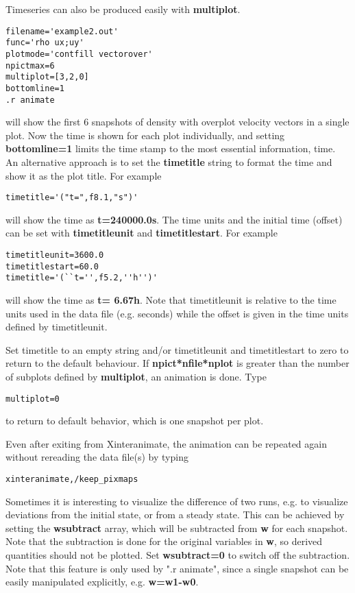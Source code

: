    Timeseries can also be produced easily with {\bf multiplot}. 
\begin{verbatim}
filename='example2.out'
func='rho ux;uy'
plotmode='contfill vectorover'
npictmax=6
multiplot=[3,2,0]
bottomline=1
.r animate
\end{verbatim}
   will show the first 6 snapshots of density with overplot velocity vectors
   in a single plot. 
   Now the time is shown for each plot individually, and setting
   {\bf bottomline=1} limits the time stamp to the most essential
   information, time. An alternative approach is to set the 
   {\bf timetitle} string to format the time and show it as the plot title.
   For example
\begin{verbatim}
timetitle='("t=",f8.1,"s")'
\end{verbatim}
   will show the time as {\bf t=240000.0s}. The time units and the
   initial time (offset) can be set with {\bf timetitleunit} 
   and {\bf timetitlestart}. For example
\begin{verbatim}
timetitleunit=3600.0
timetitlestart=60.0
timetitle='(``t='',f5.2,''h'')'
\end{verbatim}
   will show the time as {\bf t= 6.67h}. Note that timetitleunit is
   relative to the time units used in the data file (e.g. seconds)
   while the offset is given in the time units defined by timetitleunit.

   Set timetitle to an empty string and/or timetitleunit and timetitlestart
   to zero to return to the default behaviour. 
   If {\bf npict*nfile*nplot} is greater than the number 
   of subplots defined by {\bf multiplot}, an animation is done. 
   Type 
\begin{verbatim}
multiplot=0
\end{verbatim}
   to return to default behavior, which is one snapshot per plot.

   Even after exiting from Xinteranimate, the animation can be repeated
   again without rereading the data file(s) by typing
\begin{verbatim}
xinteranimate,/keep_pixmaps
\end{verbatim}
   Sometimes it is interesting to visualize the difference of two runs, e.g.
   to visualize deviations from the initial state, or from a steady state.
   This can be achieved by setting the {\bf wsubtract} array, which will be 
   subtracted from {\bf w} for each snapshot. Note that the subtraction is
   done for the original variables in {\bf w}, 
   so derived quantities should not be plotted. 
   Set {\bf wsubtract=0} to switch off the subtraction.
   Note that this feature is only used by ".r animate", since a single 
   snapshot can be easily manipulated explicitly, e.g. {\bf w=w1-w0}.

